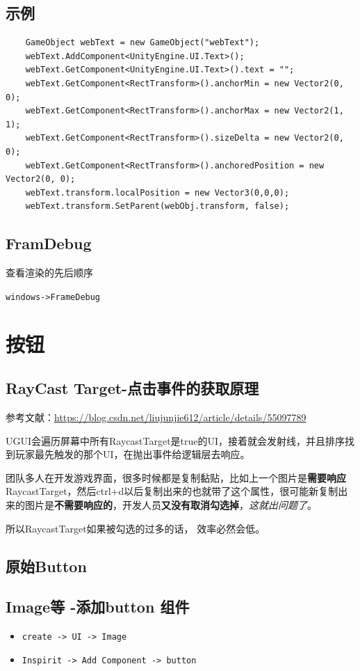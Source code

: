 \documentclass[UTF8,a4paper,12pt]{ctexbook}
\begin{document}
		\subsection{示例}
			\begin{lstlisting}
	GameObject webText = new GameObject("webText");
	webText.AddComponent<UnityEngine.UI.Text>();
	webText.GetComponent<UnityEngine.UI.Text>().text = "";
	webText.GetComponent<RectTransform>().anchorMin = new Vector2(0, 0);
	webText.GetComponent<RectTransform>().anchorMax = new Vector2(1, 1);
	webText.GetComponent<RectTransform>().sizeDelta = new Vector2(0, 0);
	webText.GetComponent<RectTransform>().anchoredPosition = new Vector2(0, 0);
	webText.transform.localPosition = new Vector3(0,0,0);
	webText.transform.SetParent(webObj.transform, false);
			\end{lstlisting}
			
		\subsection{FramDebug}
			查看渲染的先后顺序
			
			\verb|windows->FrameDebug |	
	\section{按钮}
		\subsection{RayCast Target-点击事件的获取原理}
			参考文献：\url{https://blog.csdn.net/liujunjie612/article/details/55097789}
			
			UGUI会遍历屏幕中所有RaycastTarget是true的UI，接着就会发射线，并且排序找到玩家最先触发的那个UI，在抛出事件给逻辑层去响应。
			
			团队多人在开发游戏界面，很多时候都是复制黏贴，比如上一个图片是\textbf{需要响应}RaycastTarget，然后ctrl+d以后复制出来的也就带了这个属性，很可能新复制出来的图片是\textbf{不需要响应的}，开发人员\textbf{又没有取消勾选掉}，\textit{这就出问题了}。
			
			所以RaycastTarget如果被勾选的过多的话， 效率必然会低。
		\subsection{原始Button}
			
		\subsection{Image等 -添加button 组件}
			\begin{itemize}
				\item \verb|create -> UI -> Image|
				\item \verb|Inspirit -> Add Component -> button|
			\end{itemize}	
		
\end{document}
